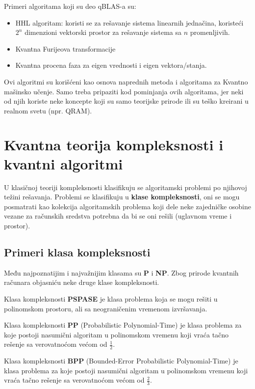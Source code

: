 \documentclass[12pt, letterpaper, oneside]{article}
\begin{document}
Primeri algoritama koji su deo qBLAS-a su: 
\begin{itemize}
    \item HHL algoritam: koristi se za rešavanje sistema linearnih jednačina, koristeći $2^n$ dimenzioni vektorski prostor
        za rešavanje sistema sa $n$ promenljivih. \cite{Quantum_machine_learning}
    \item Kvantna Furijeova transformacije \cite{Classical&quantum_info_Fourie_Phase}
    \item Kvantna procena faza za eigen vrednosti i eigen vektora/stanja. \cite{Classical&quantum_info_Fourie_Phase}
\end{itemize}
Ovi algoritmi su korišćeni kao osnova naprednih metoda i algoritama za Kvantno mašinsko učenje.
Samo treba pripaziti kod pominjanja ovih algoritama, jer neki od njih koriste neke koncepte koji su samo teorijske prirode ili su teško kreirani u realnom svetu (npr. QRAM).

\newpage
\section{Kvantna teorija kompleksnosti i kvantni algoritmi}
U klasičnoj teoriji kompleksnosti klasifikuju se algoritamski problemi po njihovoj težini rešavanja.
Problemi se klasifikuju u \textbf{klase kompleksnosti}, oni se mogu posmatrati kao kolekcija algoritamskih problema koji dele neke zajedničke osobine
vezane za računskih sredstva potrebna da bi se oni rešili (uglavnom vreme i prostor). \cite{nielsen_chuang_10th}\\

\subsection{Primeri klasa kompleksnosti}
Među najpoznatijim i najvažnijim klasama su \textbf{P} i \textbf{NP}. Zbog prirode kvantnih računara objasniću neke druge klase kompleksnosti.

Klasa kompleksnosti \textbf{PSPASE} je klasa problema koja se mogu rešiti u polinomskom prostoru, ali sa neograničenim vremenom izvršavanja.


Klasa kompleksnosti \textbf{PP} (Probabilistic Polynomial-Time) je klasa problema za koje postoji nasumični algoritam u polinomskom vremenu koji vraća
tačno rešenje sa verovatnoćom većom od $\frac{1}{2}$.

Klasa kompleksnosti \textbf{BPP} (Bounded-Error Probabilistic Polynomial-Time) je klasa problema za koje postoji nasumični algoritam u polinomskom vremenu koji vraća
tačno rešenje sa verovatnoćom većom od $\frac{2}{3}$. \cite{aaronson2013quantum}
\end{document}
